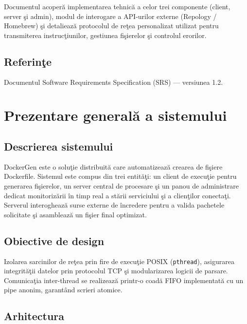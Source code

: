 \documentclass[12pt, a4paper]{article}
\begin{document}
Documentul acoper\u{a} implementarea tehnic\u{a} a celor trei componente (client, server \c{s}i admin),
modul de interogare a API-urilor externe (Repology / Homebrew) \c{s}i detalieaz\u{a} protocolul de
re\c{t}ea personalizat utilizat pentru transmiterea instruc\c{t}iunilor, gestiunea fi\c{s}ierelor \c{s}i
controlul erorilor.

\subsection{Referin\c{t}e}

Documentul Software Requirements Specification (SRS) --- versiunea 1.2.

\section{Prezentare general\u{a} a sistemului}

\subsection{Descrierea sistemului}

DockerGen este o solu\c{t}ie distribuit\u{a} care automatizeaz\u{a} crearea de fi\c{s}iere Dockerfile.
Sistemul este compus din trei entit\u{a}\c{t}i: un client de execu\c{t}ie pentru generarea fi\c{s}ierelor,
un server central de procesare \c{s}i un panou de administrare dedicat monitoriz\u{a}rii \^{i}n timp real
a st\u{a}rii serviciului \c{s}i a clien\c{t}ilor conecta\c{t}i. Serverul interogheaz\u{a} surse externe
de \^{i}ncredere pentru a valida pachetele solicitate \c{s}i asambleaz\u{a} un fi\c{s}ier final optimizat.

\subsection{Obiective de design}

Izolarea sarcinilor de re\c{t}ea prin fire de execu\c{t}ie POSIX (\texttt{pthread}), asigurarea
integrit\u{a}\c{t}ii datelor prin protocolul TCP \c{s}i modularizarea logicii de parsare.
Comunica\c{t}ia inter-thread se realizeaz\u{a} printr-o coad\u{a} FIFO implementat\u{a} cu un pipe
anonim, garantând scrieri atomice.

\subsection{Arhitectura}
\end{document}

